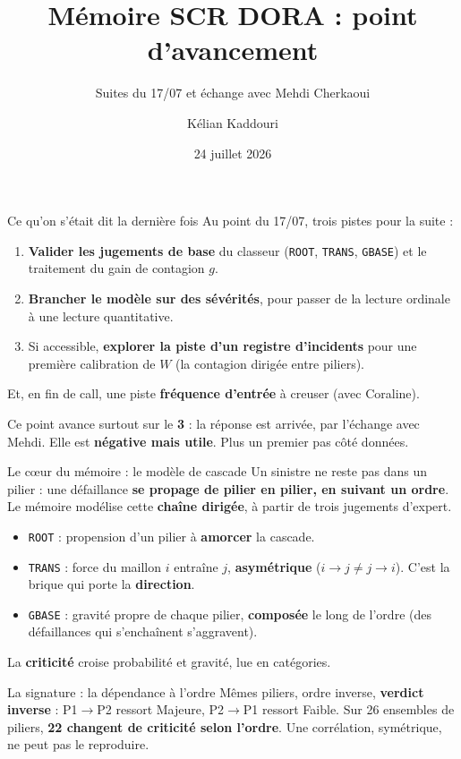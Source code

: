 \documentclass[11pt]{beamer}
\title[Point d'avancement]{Mémoire SCR DORA : point d'avancement}
\subtitle{Suites du 17/07 et échange avec Mehdi Cherkaoui}
\author[K. Kaddouri]{Kélian Kaddouri}
\institute[ENSAE / Nexialog]{ENSAE / Nexialog Consulting}
\date[24/07/2026]{24 juillet 2026}
\begin{document}
\begin{frame}
\titlepage
\end{frame}

\begin{frame}{Ce qu'on s'était dit la dernière fois}
Au point du 17/07, trois pistes pour la suite :
\begin{enumerate}
\item \textbf{Valider les jugements de base} du classeur (\texttt{ROOT}, \texttt{TRANS},
      \texttt{GBASE}) et le traitement du gain de contagion $g$.
\item \textbf{Brancher le modèle sur des sévérités}, pour passer de la lecture ordinale
      à une lecture quantitative.
\item Si accessible, \textbf{explorer la piste d'un registre d'incidents} pour une première
      calibration de $W$ (la contagion dirigée entre piliers).
\end{enumerate}
\medskip
Et, en fin de call, une piste \textbf{fréquence d'entrée} à creuser (avec Coraline).
\vfill
\begin{block}{}
Ce point avance surtout sur le \textbf{3\ieme} : la réponse est arrivée, par l'échange avec
Mehdi. Elle est \textbf{négative mais utile}. Plus un premier pas côté données.
\end{block}
\end{frame}

\begin{frame}{Le cœur du mémoire : le modèle de cascade}
Un sinistre ne reste pas dans un pilier : une défaillance \textbf{se propage de pilier en
pilier, en suivant un ordre}. Le mémoire modélise cette \textbf{chaîne dirigée}, à partir
de trois jugements d'expert.
\begin{itemize}
\item \texttt{ROOT} : propension d'un pilier à \textbf{amorcer} la cascade.
\item \texttt{TRANS} : force du maillon \og{}$i$ entraîne $j$\fg, \textbf{asymétrique}
      ($i\!\to\!j \neq j\!\to\!i$). C'est la brique qui porte la \textbf{direction}.
\item \texttt{GBASE} : gravité propre de chaque pilier, \textbf{composée} le long de
      l'ordre (des défaillances qui s'enchaînent s'aggravent).
\end{itemize}
La \textbf{criticité} croise probabilité et gravité, lue en catégories.
\vfill
\begin{block}{La signature : la dépendance à l'ordre}
Mêmes piliers, ordre inverse, \textbf{verdict inverse} : P1$\to$P2 ressort Majeure,
P2$\to$P1 ressort Faible. Sur 26 ensembles de piliers, \textbf{22 changent de criticité
selon l'ordre}. Une corrélation, symétrique, ne peut pas le reproduire.
\end{block}
\end{frame}
\end{document}
